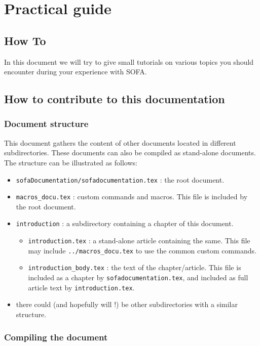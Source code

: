 \documentclass[a4paper,10pt]{report}
\begin{document}
\part{Practical guide}

\chapter{How To}
\graphicspath{{../HowTo/}}  %
In this document we will try to give small tutorials on various topics you should encounter during your experience with SOFA.




\chapter{How to contribute to this documentation}
\section{Document structure}
This document gathers the content of other documents located in different subdirectories. These documents can also be compiled as stand-alone documents.
The structure can be illustrated as follows:
\begin{itemize}
 \item \texttt{sofaDocumentation/sofadocumentation.tex} : the root document.
 \item \texttt{macros\_docu.tex} : custom commands and macros. This file is included by the root document.
 \item \texttt{introduction} : a subdirectory containing a chapter of this document.
\begin{itemize}
 \item \texttt{introduction.tex} : a stand-alone article containing the same. This file may include \texttt{../macros\_docu.tex} to use the common custom commands.
 \item \texttt{introduction\_body.tex} : the text of the chapter/article. This file is included as a chapter by \texttt{sofadocumentation.tex}, and included as full article text by \texttt{introduction.tex}.
\end{itemize}
 \item there could (and hopefully will !) be other subdirectories with a similar structure.
\end{itemize}

\section{Compiling the document}
\end{document}
